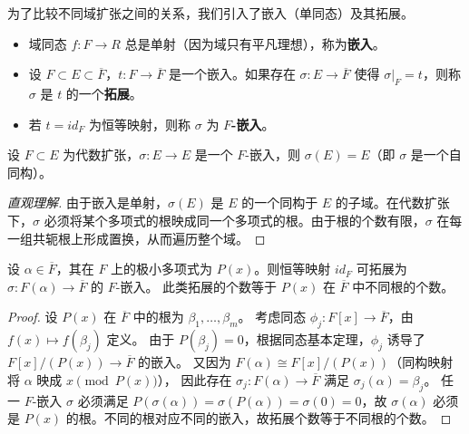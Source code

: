 \documentclass[11pt]{article}
\begin{document}
为了比较不同域扩张之间的关系，我们引入了嵌入（单同态）及其拓展。

\begin{cndefinition}[嵌入与拓展]
    \begin{itemize}
        \item 域同态 $f: F \to R$ 总是单射（因为域只有平凡理想），称为\textbf{嵌入}。
        \item 设 $F \subset E \subset \overline{F}$，$t: F \to \overline{F}$ 是一个嵌入。如果存在 $\sigma: E \to \overline{F}$ 使得 $\sigma|_F = t$，则称 $\sigma$ 是 $t$ 的一个\textbf{拓展}。
        \item 若 $t = id_F$ 为恒等映射，则称 $\sigma$ 为 \textbf{$F$-嵌入}。
    \end{itemize}
\end{cndefinition}

\begin{cntheorem}
    设 $F \subset E$ 为代数扩张，$\sigma: E \to E$ 是一个 $F$-嵌入，则 $\sigma(E) = E$（即 $\sigma$ 是一个自同构）。
\end{cntheorem}

\begin{proof}[直观理解]
    由于嵌入是单射，$\sigma(E)$ 是 $E$ 的一个同构于 $E$ 的子域。在代数扩张下，$\sigma$ 必须将某个多项式的根映成同一个多项式的根。由于根的个数有限，$\sigma$ 在每一组共轭根上形成置换，从而遍历整个域。
\end{proof}

\begin{cntheorem}[单代数扩张下的拓展]
    设 $\alpha \in \overline{F}$，其在 $F$ 上的极小多项式为 $P(x)$。则恒等映射 $id_F$ 可拓展为 $\sigma: F(\alpha) \to \overline{F}$ 的 $F$-嵌入。
    此类拓展的个数等于 $P(x)$ 在 $\overline{F}$ 中不同根的个数。
\end{cntheorem}

\begin{proof}
    设 $P(x)$ 在 $\overline{F}$ 中的根为 $\beta_1, \dots, \beta_m$。
    考虑同态 $\phi_j: F[x] \to \overline{F}$，由 $f(x) \mapsto f(\beta_j)$ 定义。
    由于 $P(\beta_j)=0$，根据同态基本定理，$\phi_j$ 诱导了 $F[x]/(P(x)) \to \overline{F}$ 的嵌入。
    又因为 $F(\alpha) \cong F[x]/(P(x))$（同构映射将 $\alpha$ 映成 $x \pmod{P(x)}$），
    因此存在 $\sigma_j: F(\alpha) \to \overline{F}$ 满足 $\sigma_j(\alpha) = \beta_j$。
    任一 $F$-嵌入 $\sigma$ 必须满足 $P(\sigma(\alpha)) = \sigma(P(\alpha)) = \sigma(0) = 0$，故 $\sigma(\alpha)$ 必须是 $P(x)$ 的根。不同的根对应不同的嵌入，故拓展个数等于不同根的个数。
\end{proof}
\end{document}
